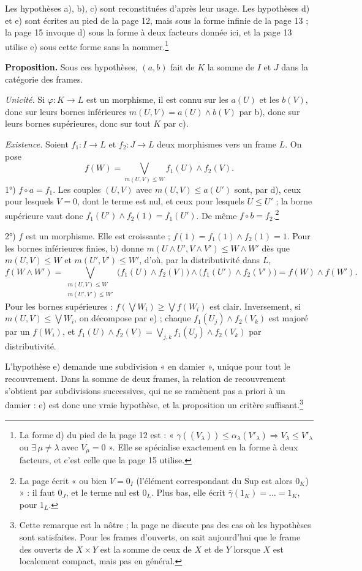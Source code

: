 \documentclass[11pt,a4paper]{article}
\begin{document}
Les hypothèses a), b), c) sont reconstituées d'après leur usage. Les
hypothèses d) et e) sont écrites au pied de la page 12, mais sous la forme
infinie de la page 13 ; la page 15 invoque d) sous la forme à deux facteurs
donnée ici, et la page 13 utilise e) sous cette forme sans la
nommer.\footnote{La forme d) du pied de la page 12 est :
« $\gamma((V_\lambda)) \leq \alpha_\lambda(V'_\lambda) \Rightarrow V_\lambda \leq V'_\lambda$
ou $\exists\,\mu \neq \lambda$ avec $V_\mu = 0$ ». Elle se spécialise
exactement en la forme à deux facteurs, et c'est celle que la page 15
utilise.}

\textbf{Proposition.} Sous ces hypothèses, $(a, b)$ fait de $K$ la somme de
$I$ et $J$ dans la catégorie des frames.

\emph{Unicité.} Si $\varphi : K \to L$ est un morphisme, il est connu sur les
$a(U)$ et les $b(V)$, donc sur leurs bornes inférieures
$m(U,V) = a(U) \wedge b(V)$ par b), donc sur leurs bornes supérieures, donc
sur tout $K$ par c).

\emph{Existence.} Soient $f_1 : I \to L$ et $f_2 : J \to L$ deux morphismes
vers un frame $L$. On pose
\[
f(W) = \bigvee_{m(U,V) \leqslant W} f_1(U) \wedge f_2(V).
\]
1°) $f \circ a = f_1$. Les couples $(U, V)$ avec $m(U,V) \leqslant a(U')$
sont, par d), ceux pour lesquels $V = 0$, dont le terme est nul, et ceux pour
lesquels $U \leqslant U'$ ; la borne supérieure vaut donc
$f_1(U') \wedge f_2(1) = f_1(U')$. De même $f \circ b = f_2$.\footnote{La page
écrit « ou bien $V = 0_I$ (l'élément correspondant du Sup est alors $0_K$) » :
il faut $0_J$, et le terme nul est $0_L$. Plus bas, elle écrit
$\bar\gamma(1_K) = \ldots = 1_K$, pour $1_L$.}

2°) $f$ est un morphisme. Elle est croissante ; $f(1) = f_1(1) \wedge f_2(1) = 1$.
Pour les bornes inférieures finies, b) donne
$m(U \wedge U', V \wedge V') \leqslant W \wedge W'$ dès que
$m(U,V) \leqslant W$ et $m(U',V') \leqslant W'$, d'où, par la distributivité
dans $L$,
\[
f(W \wedge W') = \bigvee_{\substack{m(U,V) \leqslant W \\ m(U',V') \leqslant W'}} \bigl(f_1(U) \wedge f_2(V)\bigr) \wedge \bigl(f_1(U') \wedge f_2(V')\bigr) = f(W) \wedge f(W').
\]
Pour les bornes supérieures : $f(\bigvee W_i) \geqslant \bigvee f(W_i)$ est
clair. Inversement, si $m(U,V) \leqslant \bigvee W_i$, on décompose par e) ;
chaque $f_1(U_j) \wedge f_2(V_k)$ est majoré par un $f(W_i)$, et
$f_1(U) \wedge f_2(V) = \bigvee_{j,k} f_1(U_j) \wedge f_2(V_k)$ par
distributivité.

L'hypothèse e) demande une subdivision « en damier », unique pour tout le
recouvrement. Dans la somme de deux frames, la relation de recouvrement
s'obtient par subdivisions successives, qui ne se ramènent pas a priori à un
damier : e) est donc une vraie hypothèse, et la proposition un critère
suffisant.\footnote{Cette remarque est la nôtre ; la page ne discute pas des
cas où les hypothèses sont satisfaites. Pour les frames d'ouverts, on sait
aujourd'hui que le frame des ouverts de $X \times Y$ est la somme de ceux de
$X$ et de $Y$ lorsque $X$ est localement compact, mais pas en général.}
\end{document}
